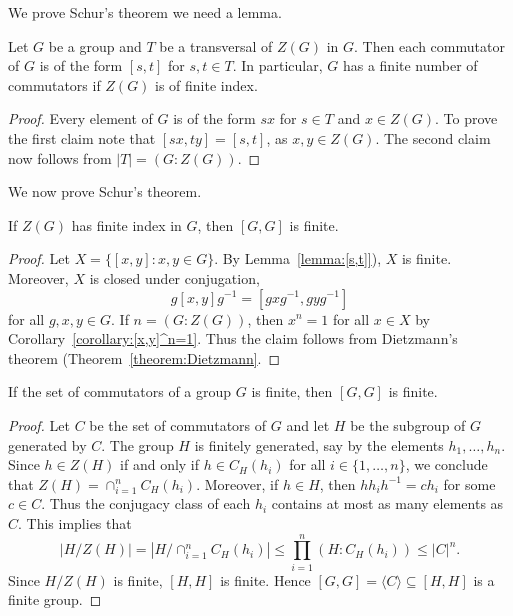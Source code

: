We prove Schur's theorem we need a lemma.

\begin{lemma}
	\label{lemma:[s,t]} 
	Let $G$ be a group and $T$ be a transversal of $Z(G)$ in
	$G$. Then each commutator of $G$ is of the form $[s,t]$ for $s,t\in T$. In particular, 
	$G$ has a finite number of commutators if $Z(G)$ is of finite index. 
\end{lemma}

\begin{proof}
	Every element of $G$ is of the form $sx$ for $s\in T$ and $x\in
	Z(G)$. To prove the first claim note that 
	$[sx,ty]=[s,t]$, 
	as $x,y\in Z(G)$. The second claim now follows from	$|T|=(G:Z(G))$.
\end{proof}

We now prove Schur's theorem. 

\begin{theorem}[Schur]
	\label{theorem:Schur_commutador}
	If $Z(G)$ has finite index in $G$, then $[G,G]$ is finite. 
\end{theorem}

\begin{proof}
	Let $X=\{[x,y]:x,y\in G\}$. By Lemma~\ref{lemma:[s,t]}), $X$ is finite.
	Moreover, $X$ is closed under conjugation, 
	\[
		g[x,y]g^{-1}=[gxg^{-1},gyg^{-1}]
	\]
	for all $g,x,y\in G$. If $n=(G:Z(G))$, then $x^n=1$ for all $x\in X$
	by Corollary~\ref{corollary:[x,y]^n=1}. Thus the claim follows from 
	Dietzmann's theorem (Theorem~\ref{theorem:Dietzmann}.
\end{proof}

\begin{corollary}[Sury]
	If the set of commutators of a group $G$ is finite, then 
	$[G,G]$ is finite.
\end{corollary}

\begin{proof}
	Let $C$ be the set of commutators of $G$ and let $H$ be the subgroup of $G$ 
	generated by $C$. The group $H$ is finitely generated, say by the elements 
	$h_1,\dots,h_n$. Since $h\in Z(H)$ if and only if $h\in C_H(h_i)$ for all 
	$i\in\{1,\dots,n\}$, we conclude that $Z(H)=\cap_{i=1}^n C_H(h_i)$. Moreover, if 
	$h\in H$, then $hh_ih^{-1}=ch_i$ for some $c\in C$. Thus the conjugacy class of each 
	$h_i$ contains at most as many elements as $C$. This implies that 
	\[
		|H/Z(H)|=|H/\cap_{i=1}^n C_H(h_i)|\leq\prod_{i=1}^n (H:C_H(h_i))\leq |C|^n.
	\]
	Since $H/Z(H)$ is finite, $[H,H]$ is finite. Hence  
	$[G,G]=\langle C\rangle\subseteq [H,H]$ 
	is a finite group. 
\end{proof}

